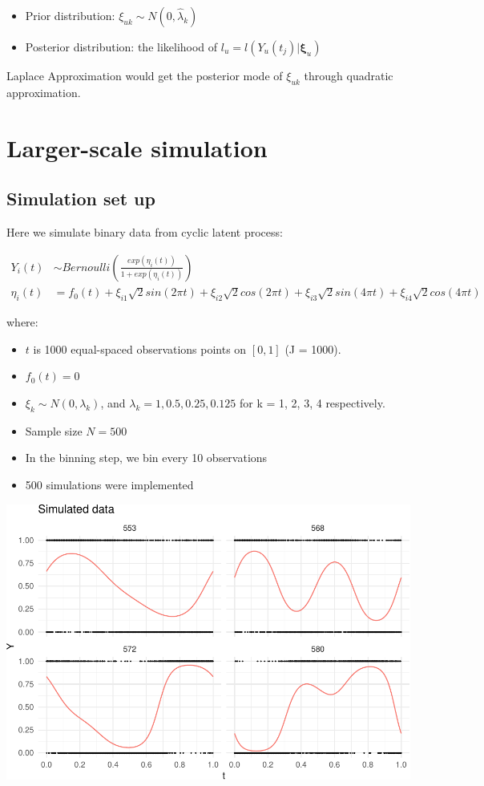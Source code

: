 \documentclass[
]{article}
\providecommand{\tightlist}{%
  \setlength{\itemsep}{0pt}\setlength{\parskip}{0pt}}
\begin{document}
\begin{itemize}
\tightlist
\item
  Prior distribution: \(\xi_{uk} \sim N(0, \hat{\lambda}_k)\)
\item
  Posterior distribution: the likelihood of
  \(l_u =l(Y_u(t_j)|\mathbf{\xi}_u)\)
\end{itemize}

Laplace Approximation would get the posterior mode of \(\xi_{uk}\)
through quadratic approximation.

\hypertarget{larger-scale-simulation}{%
\section{Larger-scale simulation}\label{larger-scale-simulation}}

\hypertarget{simulation-set-up}{%
\subsection{Simulation set up}\label{simulation-set-up}}

Here we simulate binary data from cyclic latent process:

\[\begin{aligned}
Y_i(t) & \sim Bernoulli(\frac{exp(\eta_i(t))}{1+exp(\eta_i(t))}) \\
\eta_i(t) &= f_0(t)+ \xi_{i1}\sqrt{2}sin(2\pi t)+\xi_{i2}\sqrt{2}cos(2\pi t)+\xi_{i3}\sqrt{2}sin(4\pi t)+\xi_{i4}\sqrt{2}cos(4\pi t)
\end{aligned}\]

where:

\begin{itemize}
\tightlist
\item
  \(t\) is 1000 equal-spaced observations points on \([0, 1]\) (J =
  1000).
\item
  \(f_0(t)=0\)
\item
  \(\xi_k \sim N(0, \lambda_k)\), and
  \(\lambda_k = 1, 0.5, 0.25, 0.125\) for k = 1, 2, 3, 4 respectively.
\item
  Sample size \(N = 500\)
\item
  In the binning step, we bin every 10 observations
\item
  500 simulations were implemented
\end{itemize}

\includegraphics{manuscript_files/figure-latex/fig_sim_data-1.pdf}
\end{document}

